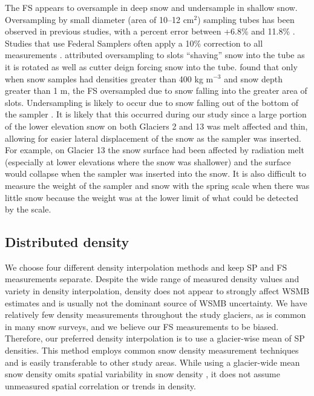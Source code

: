 \documentclass[review,oneside, letterpaper]{igs}
\begin{document}
The FS appears to oversample in deep snow and undersample in shallow snow. Oversampling by small diameter (area of 10--12 cm$^2$) sampling tubes has been observed in previous studies, with a percent error between +6.8\% and 11.8\% \citep{Work1965, Fames1982, Conger2009}. Studies that use Federal Samplers often apply a 10\% correction to all measurements \citep[e.g.][]{Molotch2005}. \cite{Dixon2012} attributed oversampling to slots ``shaving'' snow into the tube as it is rotated as well as cutter deign forcing snow into the tube. \cite{Beaumont1963} found that only when snow samples had densities greater than 400 kg m$^{-3}$ and snow depth greater than 1 m, the FS oversampled due to snow falling into the greater area of slots. Undersampling is likely to occur due to snow falling out of the bottom of the sampler \citep{Turcan1975}. It is likely that this occurred during our study since a large portion of the lower elevation snow on both Glaciers 2 and 13 was melt affected and thin, allowing for easier lateral displacement of the snow as the sampler was inserted. For example, on Glacier 13 the snow surface had been affected by radiation melt (especially at lower elevations where the snow was shallower) and the surface would collapse when the sampler was inserted into the snow. It is also difficult to measure the weight of the sampler and snow with the spring scale when there was little snow because the weight was at the lower limit of what could be detected by the scale.

\subsection{Distributed density}

We choose four different density interpolation methods and keep SP and FS measurements separate. Despite the wide range of measured density values and variety in density interpolation, density does not appear to strongly affect WSMB estimates and is usually not the dominant source of WSMB uncertainty. We have relatively few density measurements throughout the study glaciers, as is common in many snow surveys, and we believe our FS measurements to be biased. Therefore, our preferred density interpolation is to use a glacier-wise mean of SP densities. This method employs common snow density measurement techniques and is easily transferable to other study areas. While using a glacier-wide mean snow density omits spatial variability in snow density \citep{Wetlaufer2016}, it does not assume unmeasured spatial correlation or trends in density.
\end{document}
